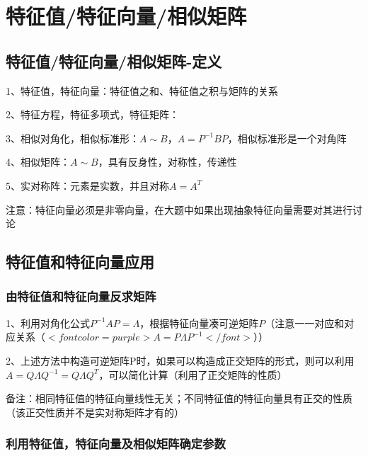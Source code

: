 \chapter{特征值/特征向量/相似矩阵}

\section{特征值/特征向量/相似矩阵-定义}

1、特征值，特征向量：特征值之和、特征值之积与矩阵的关系

2、特征方程，特征多项式，特征矩阵：

3、相似对角化，相似标准形：$ A \sim B $，$ A=P^{-1}BP $，相似标准形是一个对角阵

4、相似矩阵：$ A \sim B $，具有反身性，对称性，传递性

5、实对称阵：元素是实数，并且对称$ A=A^T $

注意：特征向量必须是非零向量，在大题中如果出现抽象特征向量需要对其进行讨论

\section{特征值和特征向量应用}



\subsection{由特征值和特征向量反求矩阵}

1、利用对角化公式$ P^{-1}AP=\Lambda $，根据特征向量凑可逆矩阵$ P $（注意一一对应和对应关系（$ <font color=purple>A=P\Lambda P^{-1}</font> $））

2、上述方法中构造可逆矩阵P时，如果可以构造成正交矩阵的形式，则可以利用$ A=Q\Lambda Q^{-1}=Q\Lambda Q^{T} $，可以简化计算（利用了正交矩阵的性质）

备注：相同特征值的特征向量线性无关；不同特征值的特征向量具有正交的性质（该正交性质并不是实对称矩阵才有的）



\subsection{利用特征值，特征向量及相似矩阵确定参数}

